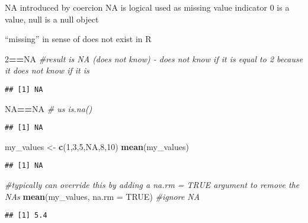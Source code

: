 \documentclass[
]{article}
\newenvironment{Shaded}{\begin{snugshade}}{\end{snugshade}}
\newcommand{\AttributeTok}[1]{\textcolor[rgb]{0.13,0.29,0.53}{#1}}
\newcommand{\CommentTok}[1]{\textcolor[rgb]{0.56,0.35,0.01}{\textit{#1}}}
\newcommand{\ConstantTok}[1]{\textcolor[rgb]{0.56,0.35,0.01}{#1}}
\newcommand{\DecValTok}[1]{\textcolor[rgb]{0.00,0.00,0.81}{#1}}
\newcommand{\FunctionTok}[1]{\textcolor[rgb]{0.13,0.29,0.53}{\textbf{#1}}}
\newcommand{\NormalTok}[1]{#1}
\newcommand{\OtherTok}[1]{\textcolor[rgb]{0.56,0.35,0.01}{#1}}
\newcommand{\SpecialCharTok}[1]{\textcolor[rgb]{0.81,0.36,0.00}{\textbf{#1}}}
\begin{document}
NA introduced by coercion NA is logical used as missing value indicator
0 is a value, null is a null object

``missing'' in sense of does not exist in R

\begin{Shaded}
\begin{Highlighting}[]
\DecValTok{2}\SpecialCharTok{==}\ConstantTok{NA} \CommentTok{\#result is NA (does not know) {-} does not know if it is equal to 2 because it does not know if it is }
\end{Highlighting}
\end{Shaded}

\begin{verbatim}
## [1] NA
\end{verbatim}

\begin{Shaded}
\begin{Highlighting}[]
\ConstantTok{NA}\SpecialCharTok{==}\ConstantTok{NA} \CommentTok{\# us is.na()}
\end{Highlighting}
\end{Shaded}

\begin{verbatim}
## [1] NA
\end{verbatim}

\begin{Shaded}
\begin{Highlighting}[]
\NormalTok{my\_values }\OtherTok{\textless{}{-}} \FunctionTok{c}\NormalTok{(}\DecValTok{1}\NormalTok{,}\DecValTok{3}\NormalTok{,}\DecValTok{5}\NormalTok{,}\ConstantTok{NA}\NormalTok{,}\DecValTok{8}\NormalTok{,}\DecValTok{10}\NormalTok{)}
\FunctionTok{mean}\NormalTok{(my\_values)}
\end{Highlighting}
\end{Shaded}

\begin{verbatim}
## [1] NA
\end{verbatim}

\begin{Shaded}
\begin{Highlighting}[]
\CommentTok{\#typically can override this by adding a na.rm = TRUE argument to remove the NAs}
\FunctionTok{mean}\NormalTok{(my\_values, }\AttributeTok{na.rm =} \ConstantTok{TRUE}\NormalTok{) }\CommentTok{\#ignore NA}
\end{Highlighting}
\end{Shaded}

\begin{verbatim}
## [1] 5.4
\end{verbatim}
\end{document}
